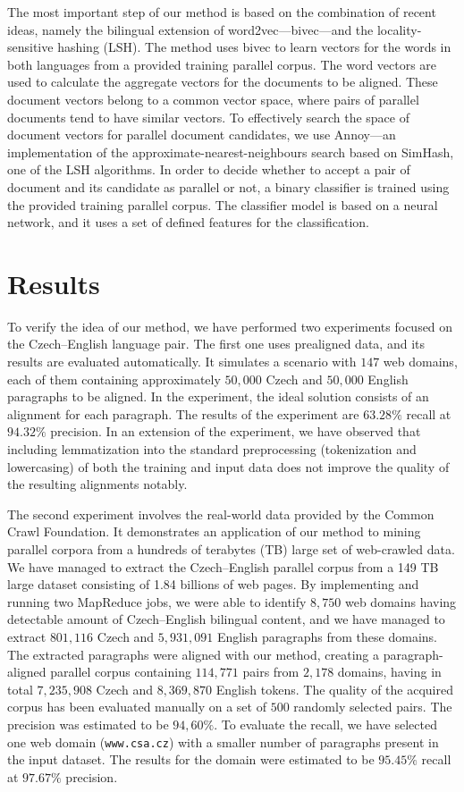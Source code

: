 The most important step of our method is based on the combination of recent ideas, namely the bilingual extension of word2vec---bivec---and the locality-sensitive hashing (LSH). The method uses bivec to learn vectors for the words in both languages from a provided training parallel corpus. The word vectors are used to calculate the aggregate vectors for the documents to be aligned. These document vectors belong to a common vector space, where pairs of parallel documents tend to have similar vectors. To effectively search the space of document vectors for parallel document candidates, we use Annoy---an implementation of the approximate-nearest-neighbours search based on SimHash, one of the LSH algorithms. In order to decide whether to accept a pair of document and its candidate as parallel or not, a binary classifier is trained using the provided training parallel corpus. The classifier model is based on a neural network, and it uses a set of defined features for the classification.

\section*{Results}

To verify the idea of our method, we have performed two experiments focused on the Czech--English language pair. The first one uses prealigned data, and its results are evaluated automatically. It simulates a scenario with $147$ web domains, each of them containing approximately $50,000$ Czech and $50,000$ English paragraphs to be aligned. In the experiment, the ideal solution consists of an alignment for each paragraph. The results of the experiment are $63.28\%$ recall at $94.32\%$ precision. In an extension of the experiment, we have observed that including lemmatization into the standard preprocessing (tokenization and lowercasing) of both the training and input data does not improve the quality of the resulting alignments notably.

The second experiment involves the real-world data provided by the Common Crawl Foundation. It demonstrates an application of our method to mining parallel corpora from a hundreds of terabytes (TB) large set of web-crawled data. We have managed to extract the Czech--English parallel corpus from a 149 TB large dataset consisting of 1.84 billions of web pages. By implementing and running two MapReduce jobs, we were able to identify $8,750$ web domains having detectable amount of Czech--English bilingual content, and we have managed to extract $801,116$ Czech and $5,931,091$ English paragraphs from these domains. The extracted paragraphs were aligned with our method, creating a paragraph-aligned parallel corpus containing $114,771$ pairs from $2,178$ domains, having in total $7,235,908$ Czech and $8,369,870$ English tokens. The quality of the acquired corpus has been evaluated manually on a set of $500$ randomly selected pairs. The precision was estimated to be $94,60\%$. To evaluate the recall, we have selected one web domain (\texttt{www.csa.cz}) with a smaller number of paragraphs present in the input dataset. The results for the domain were estimated to be $95.45\%$ recall at $97.67\%$ precision.

